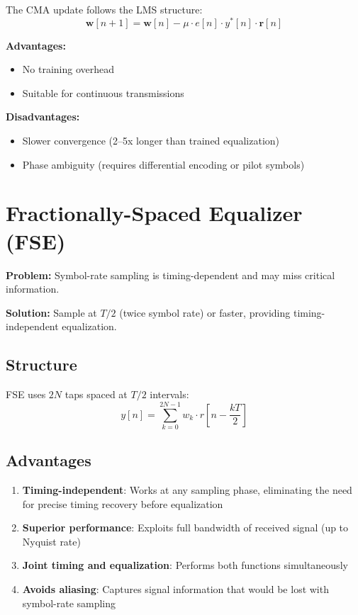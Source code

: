 The CMA update follows the LMS structure:
\begin{equation}
\mathbf{w}[n+1] = \mathbf{w}[n] - \mu \cdot e[n] \cdot y^*[n] \cdot \mathbf{r}[n]
\label{eq:cma-update}
\end{equation}

\textbf{Advantages:}
\begin{itemize}
\item No training overhead
\item Suitable for continuous transmissions
\end{itemize}

\textbf{Disadvantages:}
\begin{itemize}
\item Slower convergence (2--5x longer than trained equalization)
\item Phase ambiguity (requires differential encoding or pilot symbols)
\end{itemize}

\section{Fractionally-Spaced Equalizer (FSE)}
\label{sec:fse}

\textbf{Problem:} Symbol-rate sampling is timing-dependent and may miss critical information.

\textbf{Solution:} Sample at $T/2$ (twice symbol rate) or faster, providing timing-independent equalization.

\subsection{Structure}

FSE uses $2N$ taps spaced at $T/2$ intervals:
\begin{equation}
y[n] = \sum_{k=0}^{2N-1} w_k \cdot r\left[n - \frac{kT}{2}\right]
\label{eq:fse}
\end{equation}

\subsection{Advantages}

\begin{enumerate}
\item \textbf{Timing-independent}: Works at any sampling phase, eliminating the need for precise timing recovery before equalization
\item \textbf{Superior performance}: Exploits full bandwidth of received signal (up to Nyquist rate)
\item \textbf{Joint timing and equalization}: Performs both functions simultaneously
\item \textbf{Avoids aliasing}: Captures signal information that would be lost with symbol-rate sampling
\end{enumerate}

